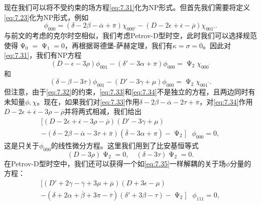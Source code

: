 现在我们可以将不受约束的场方程\ref{eq:7.31}化为NP形式。但首先我们需要将定义\ref{eq:7.23}化为NP形式，例如
\begin{equation}
	\phi _{000} =(\delta -2\beta -\overline{\alpha } +\overline{\pi } )\chi _{000'} -(D-2\epsilon +\overline{\epsilon } -\overline{\rho } )\chi _{001'} .
	\label{eq:7.32}
\end{equation}
与前文的考虑的克尔时空相似，我们考虑Petrov-D型时空，此时我们可以选择规范使得$\upPsi _{0} =\upPsi _{1} =0$，再根据哥德堡-萨赫定理，我们有$\kappa =\sigma =0$。因此对\ref{eq:7.31}，我们有NP方程
\begin{equation}
	(D-\epsilon -3\rho )\phi _{001} -(\delta '-3\alpha +\pi ) \phi _{000} =\upPsi _{2} \chi _{000^{\prime }}
	\label{eq:7.33}
\end{equation}
和
\begin{equation}
	(\delta -\beta -3\tau )\phi _{001} -(D'-3\gamma +\mu )\phi _{000} =\upPsi _{2} \chi _{001^{\prime }} .
	\label{eq:7.34}
\end{equation}
但注意，由于\ref{eq:7.32}的约束，\ref{eq:7.33}和\ref{eq:7.34}不是独立的方程，且两边同时有未知量$\phi ,\chi $。现在，如果我们对\ref{eq:7.33}作用$\delta -2\beta -\overline{\alpha } -2\tau +\overline{\pi }$，对\ref{eq:7.34}作用$D-2\epsilon +\overline{\epsilon } -3\rho -\overline{\rho }$并将两式相减，我们给出
\begin{equation}
	\begin{aligned}
		[ (D-2\epsilon +\overline{\epsilon } -3\rho -\overline{\rho } )(D'-3\gamma +\mu ) & \\
		-(\delta -2\beta -\overline{\alpha } -3\tau +\overline{\pi } )(\overline{\delta } -3\alpha +\pi )-\upPsi _{2}] & \phi _{000} =0,
	\end{aligned}
	\label{eq:7.35}
\end{equation}
这是只关于$\phi _{000}$的线性微分方程。这里我们用到了比安基恒等式
\begin{equation*}
	(D-3\rho )\upPsi _{2} =0,\quad (\delta -3\tau )\upPsi _{2} =0.
\end{equation*}
在Petrov-D型时空中，我们还可以获得一个如\ref{eq:7.35}一样解耦的关于场$\phi $分量的方程：
\begin{equation}
	\begin{aligned}
		[ (D'+2\gamma -\overline{\gamma } +3\mu +\overline{\mu } )(D+3\epsilon -\mu ) & \\
		-(\delta +2\alpha +\overline{\beta } +3\pi -\overline{\tau } )(\delta '+3\beta -\tau )-\upPsi _{2}] & \phi _{111} =0,
	\end{aligned}
	\label{eq:7.36}
\end{equation}
